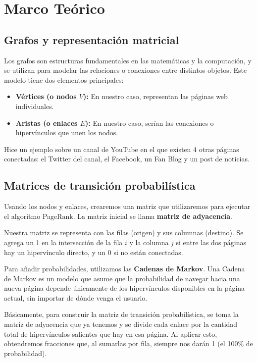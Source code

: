 
\section{Marco Teórico}

\subsection{Grafos y representación matricial}
Los grafos son estructuras fundamentales en las matemáticas y la computación, y se utilizan para modelar las relaciones o conexiones entre distintos objetos. Este modelo tiene dos elementos principales:
\begin{itemize}
    \item \textbf{Vértices (o nodos $V$):} En nuestro caso, representan las páginas web individuales.
    \item \textbf{Aristas (o enlaces $E$):} En nuestro caso, serían las conexiones o hipervínculos que unen los nodos.
\end{itemize}

Hice un ejemplo sobre un canal de YouTube en el que existen 4 otras páginas conectadas: el Twitter del canal, el Facebook, un Fan Blog y un post de noticias.

\subsection{Matrices de transición probabilística}
Usando los nodos y enlaces, crearemos una matriz que utilizaremos para ejecutar el algoritmo PageRank. La matriz inicial se llama \textbf{matriz de adyacencia}.

Nuestra matriz se representa con las filas (origen) y sus columnas (destino). Se agrega un 1 en la intersección de la fila $i$ y la columna $j$ si entre las dos páginas hay un hipervínculo directo, y un 0 si no están conectadas.

Para añadir probabilidades, utilizamos las \textbf{Cadenas de Markov}. Una Cadena de Markov es un modelo que asume que la probabilidad de navegar hacia una nueva página depende únicamente de los hipervínculos disponibles en la página actual, sin importar de dónde venga el usuario.

Básicamente, para construir la matriz de transición probabilística, se toma la matriz de adyacencia que ya tenemos y se divide cada enlace por la cantidad total de hipervínculos salientes que hay en esa página. Al aplicar esto, obtendremos fracciones que, al sumarlas por fila, siempre nos darán 1 (el 100\% de probabilidad).

